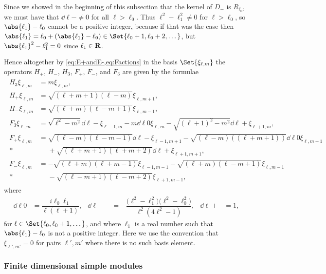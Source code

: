 Since we showed in the beginning of this subsection that the kernel of $D_-$ is $R_{\ell_0}$, we must have that $\dd{\ell}{-}\neq 0$ for all $\ell>\ell_0$. Thus $\ell^2-\ell_1^2\neq 0$ for $\ell>\ell_0$, so $\abs{\ell_1}-\ell_0$ cannot be a positive integer, because if that was the case then $\abs{\ell_1}= \ell_0+(\abs{\ell_1}-\ell_0) \in \Set{\ell_0+1,\ell_0+2,\dotsc}$, but $\abs{\ell_1}^2-\ell_1^2=0$ since $\ell_1\in\mathbf{R}$.

Hence altogether by \cref{eq:E+andE-,eq:Factions} in the basis $\Set{\xi_{\ell,m}}$ the operators $H_+$, $H_-$, $H_3$, $F_+$, $F_-$, and $F_3$ are given by the formulae
\begin{align}\label{eq:infdimactions}
  \begin{aligned}
    H_3\xi_{\ell,m} &= m\xi_{\ell,m}, \\
    H_+\xi_{\ell,m} &= \sqrt{(\ell+m+1)(\ell-m)} \xi_{\ell,m+1}, \\
    H_-\xi_{\ell,m} &= \sqrt{(\ell+m)(\ell-m+1)} \xi_{\ell,m-1}, \\
    F_3\xi_{\ell,m} &= \sqrt{\ell^2-m^2} \dd{\ell}{-}\xi_{\ell-1,m} - m \dd{\ell}{0}\xi_{\ell,m} - \sqrt{(\ell+1)^2-m^2}\dd{\ell}{+}\xi_{\ell+1,m}, \\
    F_+\xi_{\ell,m} &= \sqrt{(\ell-m)(\ell-m-1)}\dd{\ell}{-}\xi_{\ell-1,m+1} - \sqrt{(\ell-m)((\ell+m+1))}\dd{\ell}{0}\xi_{\ell,m+1} \\*
    &\phantom{{}={}}{} + \sqrt{(\ell+m+1)(\ell+m+2)} \dd{\ell}{+}\xi_{\ell+1,m+1}, \\
    F_-\xi_{\ell,m} &= -\sqrt{(\ell+m)(\ell+m-1)}\xi_{\ell-1,m-1} - \sqrt{(\ell+m)(\ell-m+1)}\xi_{\ell,m-1} \\*
    &\phantom{{}={}}{} - \sqrt{(\ell-m+1)(\ell-m+2)}\xi_{\ell+1,m-1},
  \end{aligned}
\end{align}
where
\begin{align}\label{eq:infdimds}
  \dd{\ell}{0} &= \dfrac{i\ell_0\ell_1}{\ell(\ell+1)}, & \dd{\ell}{-} &= -\dfrac{\bigl(\ell^2 - \ell_1^2\bigr)\bigl( \ell^2 - \ell_0^2 \bigr)}{\ell^2(4\ell^2-1)}, & \dd{\ell}{+} &= 1,
\end{align}
for $\ell\in\Set{\ell_0,\ell_0+1,\dotsc}$, and where $\ell_1$ is a real number such that $\abs{\ell_1}-\ell_0$ is not a positive integer. Here we use the convention that $\xi_{\ell',m'}=0$ for pairs $\ell',m'$ where there is no such basis element.

\subsubsection{Finite dimensional simple modules}

